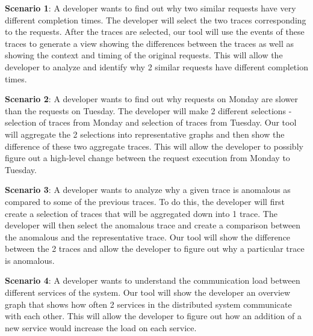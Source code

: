 \textbf{Scenario 1}: A developer wants to find out why two similar requests have very different 
completion times. The developer will select the two traces corresponding to the requests. After the traces are selected, our tool will
use the events of these traces to generate a view showing the differences between the traces as well as showing the
context and timing of the original requests. This will allow the developer to analyze and identify why 2 similar requests have 
different completion times.

 \textbf{Scenario 2}: A developer wants to find out why requests on Monday are
slower than the requests on Tuesday. The developer will make 2 different selections - selection of traces from Monday and selection
of traces from Tuesday. Our tool will aggregate the 2 selections into representative graphs and then show the difference of these
two aggregate traces. This will allow the developer to possibly figure out a high-level change between the request execution from
Monday to Tuesday.

 \textbf{Scenario 3}: A developer wants to analyze why a given trace is anomalous as compared to some of the previous
traces. To do this, the developer will first create a selection of traces that will be aggregated down into 1 trace. The developer
will then select the anomalous trace and create a comparison between the anomalous and the representative trace.
Our tool will show the difference between the 2 traces and allow the developer to figure out why a particular trace is anomalous.

 \textbf{Scenario 4}: A developer wants to understand the communication load between different services of the system.
Our tool will show the developer an overview graph that shows how often 2 services in the distributed system communicate
with each other. This will allow the developer to figure out how an addition of a new service would increase the load on each
service.